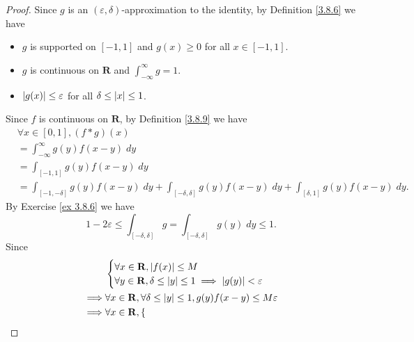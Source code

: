 \begin{proof}
    Since \(g\) is an \((\varepsilon, \delta)\)-approximation to the identity, by Definition \ref{3.8.6} we have
    \begin{itemize}
        \item \(g\) is supported on \([-1, 1]\) and \(g(x) \geq 0\) for all \(x \in [-1, 1]\).
        \item \(g\) is continuous on \(\mathbf{R}\) and \(\int_{-\infty}^\infty g = 1\).
        \item \(\abs*{g(x)} \leq \varepsilon\) for all \(\delta \leq \abs*{x} \leq 1\).
    \end{itemize}
    Since \(f\) is continuous on \(\mathbf{R}\), by Definition \ref{3.8.9} we have
    \begin{align*}
         & \forall x \in [0, 1], (f * g)(x)                                                                                                    \\
         & = \int_{-\infty}^\infty g(y) f(x - y) \; dy                                                                                         \\
         & = \int_{[-1, 1]} g(y) f(x - y) \; dy                                                                                                \\
         & = \int_{[-1, -\delta]} g(y) f(x - y) \; dy + \int_{[-\delta, \delta]} g(y) f(x - y) \; dy + \int_{[\delta, 1]} g(y) f(x - y) \; dy.
    \end{align*}
    By Exercise \ref{ex 3.8.6} we have
    \[
        1 - 2 \varepsilon \leq \int_{[-\delta, \delta]} g = \int_{[-\delta, \delta]} g(y) \; dy \leq 1.
    \]
    Since
    \begin{align*}
                 & \begin{cases}
                       \forall x \in \mathbf{R}, \abs*{f(x)} \leq M \\
                       \forall y \in \mathbf{R}, \delta \leq \abs*{y} \leq 1 \implies \abs*{g(y)} < \varepsilon
                   \end{cases}                                                                       \\
        \implies & \forall x \in \mathbf{R}, \forall \delta \leq \abs*{y} \leq 1, g(y) f(x - y) \leq M \varepsilon                                                               \\
        \implies & \forall x \in \mathbf{R}, \begin{cases}

\end{cases}
\end{align*}
\end{proof}

